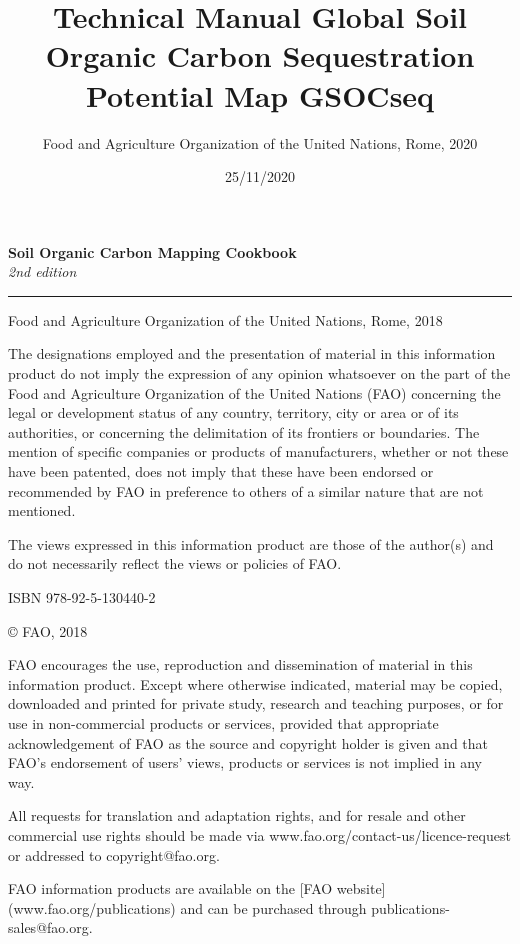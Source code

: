 \documentclass[
  10pt,
  b5paper,
]{book}
\title{Technical Manual Global Soil Organic Carbon Sequestration Potential Map GSOCseq}
\author{Food and Agriculture Organization of the United Nations, Rome, 2020}
\date{25/11/2020}
\begin{document}
\maketitle

\pagestyle{plain}

\begin{titlepage}
    \begin{center}
        \vspace*{4cm}
        \Large

        \textcolor{astral}{\textbf{Soil Organic Carbon Mapping Cookbook\\}}
        \vspace{0.5cm}
        \normalsize
        \emph{2nd edition}
        \vfill
        \noindent
        {\color{astral}\rule{\linewidth}{0.5mm} }

        Food and Agriculture Organization of the United Nations, Rome, 2018
    \end{center}
\end{titlepage}

\clearpage
\thispagestyle{empty}

\vfill
{\footnotesize
\vspace*{4cm}
\vfill
The designations employed and the presentation of material in this information product do not imply the expression of any opinion whatsoever on the part of the Food and Agriculture Organization of the United Nations (FAO) concerning the legal or development status of any country, territory, city or area or of its authorities, or concerning the delimitation of its frontiers or boundaries. The mention of specific companies or products of manufacturers, whether or not these have been patented, does not imply that these have been endorsed or recommended by FAO in preference to others of a similar nature that are not mentioned.

The views expressed in this information product are those of the author(s) and do not necessarily reflect the views or policies of FAO.

ISBN 978-92-5-130440-2

\copyright \xspace FAO, 2018

FAO encourages the use, reproduction and dissemination of material in this information product. Except where otherwise indicated, material may be copied, downloaded and printed for private study, research and teaching purposes, or for use in non-commercial products or services, provided that appropriate acknowledgement of FAO as the source and copyright holder is given and that FAO’s endorsement of users’ views, products or services is not implied in any way.

All requests for translation and adaptation rights, and for resale and other commercial use rights should be made via www.fao.org/contact-us/licence-request or addressed to copyright@fao.org.


FAO information products are available on the [FAO website](www.fao.org/publications) and can be purchased through publications-sales@fao.org.
}
\end{document}
